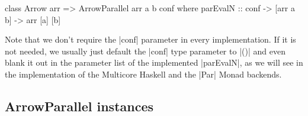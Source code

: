  
\begin{code}
class Arrow arr => ArrowParallel arr a b conf where
	parEvalN :: conf -> [arr a b] -> arr [a] [b]
\end{code}
Note that we don't require the |conf| parameter in every implementation. If it is not needed, we usually just default the |conf| type parameter to |()| and even blank it out in the parameter list of the implemented |parEvalN|, as we will see in the implementation of the Multicore Haskell and the |Par| Monad backends.

\subsection{ArrowParallel instances}

